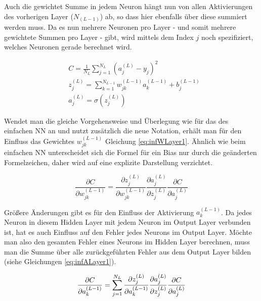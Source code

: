Auch die gewichtet Summe in jedem Neuron hängt nun von allen Aktivierungen des vorherigen Layer ($N_{(L-1)}$) ab, so dass hier ebenfalls über diese summiert werden muss. Da es nun mehrere Neuronen pro Layer - und somit mehrere gewichtete Summen pro Layer - gibt, wird mittels dem Index  $j$ noch spezifiziert, welches Neuronen gerade berechnet wird.

\begin{equation} \label{eq:forwardMulti}
    \begin{split}
        &C=\frac{1}{N_{L}} \sum_{j=1}^{N_{L}}\left(a_{j}^{(L)}-y_{j}\right)^{2} \\
        &z_{j}^{(L)}=\sum_{k=1}^{N_{L-1}} w_{j k}^{(L-1)} a_{k}^{(L-1)}+b_{j}^{(L-1)} \\
        &a_{j}^{(L)}=\sigma\left(z_{j}^{(L)}\right)
    \end{split}
\end{equation}


Wendet man die gleiche Vorgehensweise und Überlegung wie für das des einfachen \ac{NN} an und nutzt zusätzlich die neue Notation, erhält man für den Einfluss das Gewichtes $w_{j k}^{(L-1)}$ Gleichung \ref{eq:infWLayer1}. Ähnlich wie beim einfachen \ac{NN} unterscheidet sich die Formel für ein Bias nur durch die geänderten Formelzeichen, daher wird auf eine explizite Darstellung verzichtet.


\begin{equation} \label{eq:infWLayer1}
    \frac{\partial C}{\partial w_{j k}^{(L-1)}}=\frac{\partial z_{j}^{(L)}}{\partial w_{j k}^{(L-1)}} \frac{\partial a_{j}^{(L)}}{\partial z_{j}^{(L)}} \frac{\partial C}{\partial a_{j}^{(L)}}
\end{equation}

Größere Änderungen gibt es für den Einfluss der Aktivierung $a_{k}^{(L-1)}$. Da jedes Neuron in diesem Hidden Layer mit jedem Neuron im Output Layer verbunden ist, hat es auch Einfluss auf den Fehler jedes Neurons im Output Layer. Möchte man also den gesamten Fehler eines Neurons im Hidden Layer berechnen, muss man die Summe über alle zurückgeführten Fehler aus dem Output Layer bilden (siehe Gleichungen \ref{eq:infALayer1}).

\begin{equation} \label{eq:infALayer1}
        \frac{\partial C}{\partial a_{k}^{(L-1)}}=\sum_{j=1}^{N_{L}} \frac{\partial z_{j}^{(L)}}{\partial a_{k}^{(L-1)}} \frac{\partial a_{j}^{(L)}}{\partial z_{j}^{(L)}} \frac{\partial C}{\partial a_{j}^{(L)}} \\
\end{equation}

